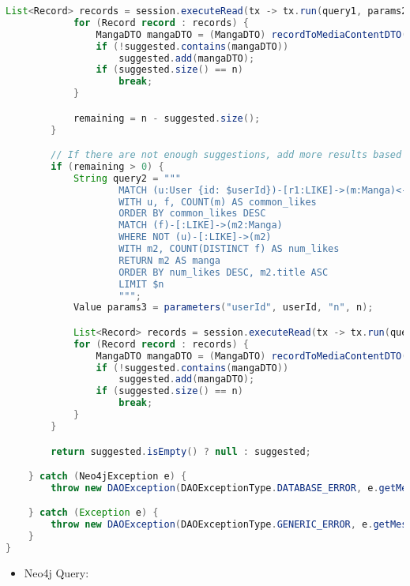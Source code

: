 \begin{mdframed}[style=customstyle]
\begin{lstlisting}[language=java]
            List<Record> records = session.executeRead(tx -> tx.run(query1, params2).list());
            for (Record record : records) {
                MangaDTO mangaDTO = (MangaDTO) recordToMediaContentDTO(record);
                if (!suggested.contains(mangaDTO))
                    suggested.add(mangaDTO);
                if (suggested.size() == n)
                    break;
            }

            remaining = n - suggested.size();
        }

        // If there are not enough suggestions, add more results based on all likes
        if (remaining > 0) {
            String query2 = """
                    MATCH (u:User {id: $userId})-[r1:LIKE]->(m:Manga)<-[:LIKE]-(f:User)
                    WITH u, f, COUNT(m) AS common_likes
                    ORDER BY common_likes DESC
                    MATCH (f)-[:LIKE]->(m2:Manga)
                    WHERE NOT (u)-[:LIKE]->(m2)
                    WITH m2, COUNT(DISTINCT f) AS num_likes
                    RETURN m2 AS manga
                    ORDER BY num_likes DESC, m2.title ASC
                    LIMIT $n
                    """;
            Value params3 = parameters("userId", userId, "n", n);

            List<Record> records = session.executeRead(tx -> tx.run(query2, params3).list());
            for (Record record : records) {
                MangaDTO mangaDTO = (MangaDTO) recordToMediaContentDTO(record);
                if (!suggested.contains(mangaDTO))
                    suggested.add(mangaDTO);
                if (suggested.size() == n)
                    break;
            }
        }

        return suggested.isEmpty() ? null : suggested;

    } catch (Neo4jException e) {
        throw new DAOException(DAOExceptionType.DATABASE_ERROR, e.getMessage());

    } catch (Exception e) {
        throw new DAOException(DAOExceptionType.GENERIC_ERROR, e.getMessage());
    }
}\end{lstlisting}
\end{mdframed}

\newpage

\begin{itemize}
    \item Neo4j Query:
\end{itemize}


